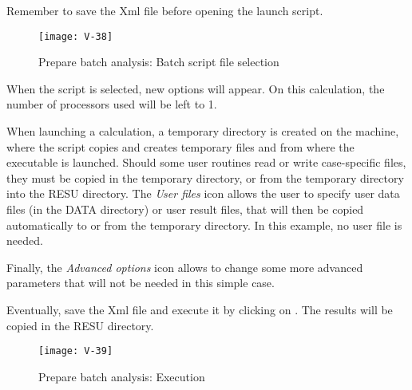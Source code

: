 Remember to save the Xml file before opening the launch script.

\begin{figure}[ht]
\begin{center}
\texttt{[image: V-38]}
\caption{Prepare batch analysis: Batch script file selection}
\label{fig42_e1}
\end{center}
\end{figure}


\clearpage
When the script is selected, new options will appear.
On this calculation, the number of processors used will be left to 1.

When launching a calculation, a temporary directory is created on the machine,
where the script copies and creates temporary files and from where the \CS
executable is launched. Should some user routines read or write case-specific
files, they must be copied in the temporary directory, or from the temporary
directory into the RESU directory. The {\itshape User files} icon allows the
user to specify user data files (in the DATA directory) or user result files,
that will then be copied automatically to or from the temporary directory.
In this example, no user file is needed.

Finally, the {\itshape Advanced options} icon allows to change some more
advanced parameters that will not be needed in this simple case.

Eventually, save the Xml file and execute it by clicking on
. The results will be copied in the RESU
directory.

\begin{figure}[ht]
\begin{center}
\texttt{[image: V-39]}
\caption{Prepare batch analysis: Execution}
\label{fig43_e1}
\end{center}
\end{figure}


